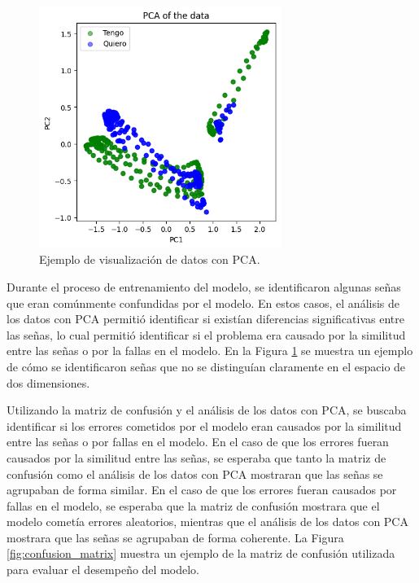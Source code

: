 \begin{figure}[H]
    \centering
    \includegraphics[width=0.7\textwidth]{figuras/ExamplePCA.png}
    \caption{Ejemplo de visualización de datos con PCA.}
    \label{fig:pca}
\end{figure}

Durante el proceso de entrenamiento del modelo, se identificaron algunas señas que eran comúnmente confundidas por el modelo. 
En estos casos, el análisis de los datos con PCA permitió identificar si existían diferencias significativas entre las señas, lo cual permitió identificar si el problema era causado por la similitud entre las señas o por la fallas en el modelo.
En la Figura \ref{fig:pca} se muestra un ejemplo de cómo se identificaron señas que no se distinguían claramente en el espacio de dos dimensiones.

Utilizando la matriz de confusión y el análisis de los datos con PCA, se buscaba identificar si los errores cometidos por el modelo eran causados por la similitud entre las señas o por fallas en el modelo.
En el caso de que los errores fueran causados por la similitud entre las señas, se esperaba que tanto la matriz de confusión como el análisis de los datos con PCA mostraran que las señas se agrupaban de forma similar.
En el caso de que los errores fueran causados por fallas en el modelo, se esperaba que la matriz de confusión mostrara que el modelo cometía errores aleatorios, mientras que el análisis de los datos con PCA mostrara que las señas se agrupaban de forma coherente.
La Figura \ref{fig:confusion_matrix} muestra un ejemplo de la matriz de confusión utilizada para evaluar el desempeño del modelo.


